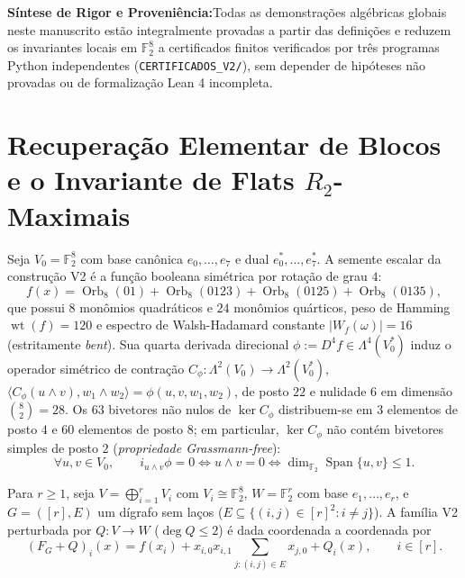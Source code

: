 \documentclass[11pt,a4paper]{article}
\theoremstyle{definition}
\theoremstyle{remark}
\newcommand{\takeaway}[2]{%
  \vspace{6pt}%
  \noindent\colorbox{primary!7}{%
    \parbox{\dimexpr\textwidth-2\fboxsep\relax}{%
      \vspace{4pt}\textbf{\color{primary}#1:}\hspace{0.5em}#2\vspace{4pt}%
    }%
  }%
  \vspace{6pt}%
}
\newcommand{\F}{\mathbb{F}_2}
\newcommand{\Orb}{\operatorname{Orb}}
\begin{document}
\takeaway{Síntese de Rigor e Proveniência}{Todas as demonstrações algébricas globais neste manuscrito estão integralmente provadas a partir das definições e reduzem os invariantes locais em $\F^8$ a certificados finitos verificados por três programas Python independentes (\texttt{CERTIFICADOS\_V2/}), sem depender de hipóteses não provadas ou de formalização Lean 4 incompleta.}

\vspace{8pt}
\section{Recuperação Elementar de Blocos e o Invariante de Flats $R_2$-Maximais}

Seja $V_0 = \F^8$ com base canônica $e_0,\dots,e_7$ e dual $e_0^*,\dots,e_7^*$. A semente escalar da construção V2 é a função booleana simétrica por rotação de grau $4$:
\begin{equation}\label{eq:seed}
  f(x) = \Orb_8(01) + \Orb_8(0123) + \Orb_8(0125) + \Orb_8(0135),
\end{equation}
que possui $8$ monômios quadráticos e $24$ monômios quárticos, peso de Hamming $\operatorname{wt}(f) = 120$ e espectro de Walsh-Hadamard constante $|W_f(\omega)| = 16$ (estritamente \emph{bent}). Sua quarta derivada direcional $\phi := D^4 f \in \Lambda^4(V_0^*)$ induz o operador simétrico de contração $C_\phi : \Lambda^2(V_0) \to \Lambda^2(V_0^*)$, $\langle C_\phi(u\wedge v), w_1\wedge w_2\rangle = \phi(u,v,w_1,w_2)$, de posto $22$ e nulidade $6$ em dimensão $\binom{8}{2} = 28$. Os $63$ bivetores não nulos de $\ker C_\phi$ distribuem-se em $3$ elementos de posto $4$ e $60$ elementos de posto $8$; em particular, $\ker C_\phi$ não contém bivetores simples de posto $2$ (\emph{propriedade Grassmann-free}):
\begin{equation}\label{eq:gf}
  \forall u,v \in V_0,\qquad i_{u\wedge v}\phi = 0 \iff u\wedge v = 0 \iff \dim_{\F}\operatorname{Span}\{u,v\} \le 1.
\end{equation}

Para $r \ge 1$, seja $V = \bigoplus_{i=1}^r V_i$ com $V_i \cong \F^8$, $W = \F^r$ com base $e_1,\dots,e_r$, e $G = ([r], E)$ um dígrafo sem laços ($E \subseteq \{ (i,j) \in [r]^2 : i \neq j \}$). A família V2 perturbada por $Q : V \to W$ ($\deg Q \le 2$) é dada coordenada a coordenada por
\begin{equation}\label{eq:family}
  (F_G + Q)_i(x) = f(x_i) + x_{i,0} x_{i,1} \sum_{j : (i,j) \in E} x_{j,0} + Q_i(x), \qquad i \in [r].
\end{equation}
\end{document}
